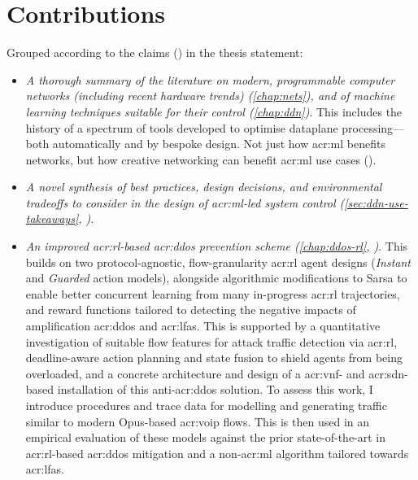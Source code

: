 \section{Contributions}
Grouped according to the claims () in the thesis statement:
\begin{itemize}
	\item \emph{A thorough summary of the literature on modern, programmable computer networks (including recent hardware trends) (\cref{chap:nets}), and of machine learning techniques suitable for their control (\cref{chap:ddn})}. This includes the history of a spectrum of tools developed to optimise dataplane processing---both automatically and by bespoke design. Not just how \gls{acr:ml} benefits networks, but how creative networking can benefit \gls{acr:ml} use cases ().
	
	\item \emph{A novel synthesis of best practices, design decisions, and environmental tradeoffs to consider in the design of \gls{acr:ml}-led system control (\cref{sec:ddn-use-takeaways}, )}.
	
	\item \emph{An improved \gls{acr:rl}-based \gls{acr:ddos} prevention scheme (\cref{chap:ddos-rl}, )}.
	This builds on two protocol-agnostic, flow-granularity \gls{acr:rl} agent designs (\emph{Instant} and \emph{Guarded} action models), alongside algorithmic modifications to Sarsa to enable better concurrent learning from many in-progress \gls{acr:rl} trajectories, and reward functions tailored to detecting the negative impacts of amplification \gls{acr:ddos} and \glspl{acr:lfa}.
	This is supported by a quantitative investigation of suitable flow features for attack traffic detection via \gls{acr:rl}, deadline-aware action planning and state fusion to shield agents from being overloaded, and a concrete architecture and design of a \gls{acr:vnf}- and \gls{acr:sdn}-based installation of this anti-\gls{acr:ddos} solution.
	To assess this work, I introduce procedures and trace data for modelling and generating traffic similar to modern Opus-based \gls{acr:voip} flows.
	This is then used in an empirical evaluation of these models against the prior state-of-the-art in \gls{acr:rl}-based \gls{acr:ddos} mitigation and a  non-\gls{acr:ml} algorithm tailored towards \glspl{acr:lfa}.
		

\end{itemize}
